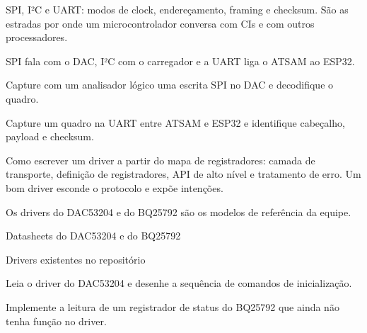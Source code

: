 SPI, I²C e UART: modos de clock, endereçamento, framing e checksum. São as estradas por onde um microcontrolador conversa com CIs e com outros processadores.

\begin{noproduto}
SPI fala com o DAC, I²C com o carregador e a UART liga o ATSAM ao ESP32.
\end{noproduto}

\begin{paraestudar}
  \item {}
  \item {}
  \item {}
\end{paraestudar}

\begin{pratique}
  \item Capture com um analisador lógico uma escrita SPI no DAC e decodifique o quadro.
  \item Capture um quadro na UART entre ATSAM e ESP32 e identifique cabeçalho, payload e checksum.
\end{pratique}

Como escrever um driver a partir do mapa de registradores: camada de transporte, definição de registradores, API de alto nível e tratamento de erro. Um bom driver esconde o protocolo e expõe intenções.

\begin{noproduto}
Os drivers do DAC53204 e do BQ25792 são os modelos de referência da equipe.
\end{noproduto}

\begin{paraestudar}
  \item Datasheets do DAC53204 e do BQ25792
  \item Drivers existentes no repositório
\end{paraestudar}

\begin{pratique}
  \item Leia o driver do DAC53204 e desenhe a sequência de comandos de inicialização.
  \item Implemente a leitura de um registrador de status do BQ25792 que ainda não tenha função no driver.
\end{pratique}

